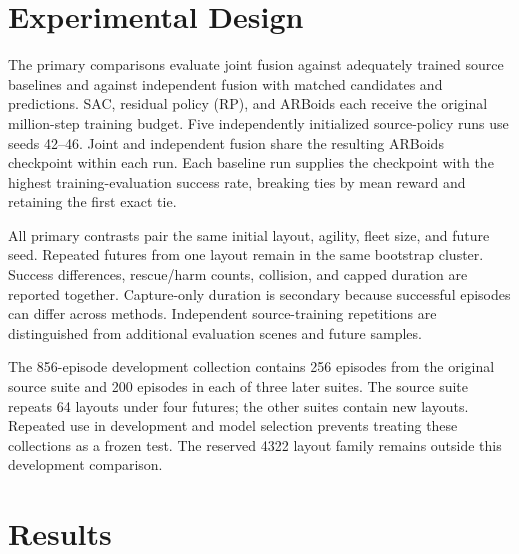 \documentclass[journal]{IEEEtran}
\begin{document}
\section{Experimental Design}
The primary comparisons evaluate joint fusion against adequately trained source baselines and against independent fusion with matched candidates and predictions. SAC, residual policy (RP), and ARBoids each receive the original million-step training budget. Five independently initialized source-policy runs use seeds 42--46. Joint and independent fusion share the resulting ARBoids checkpoint within each run. Each baseline run supplies the checkpoint with the highest training-evaluation success rate, breaking ties by mean reward and retaining the first exact tie.

All primary contrasts pair the same initial layout, agility, fleet size, and future seed. Repeated futures from one layout remain in the same bootstrap cluster. Success differences, rescue/harm counts, collision, and capped duration are reported together. Capture-only duration is secondary because successful episodes can differ across methods. Independent source-training repetitions are distinguished from additional evaluation scenes and future samples.

The 856-episode development collection contains 256 episodes from the original source suite and 200 episodes in each of three later suites. The source suite repeats 64 layouts under four futures; the other suites contain new layouts. Repeated use in development and model selection prevents treating these collections as a frozen test. The reserved 4322 layout family remains outside this development comparison.

\section{Results}
\end{document}
